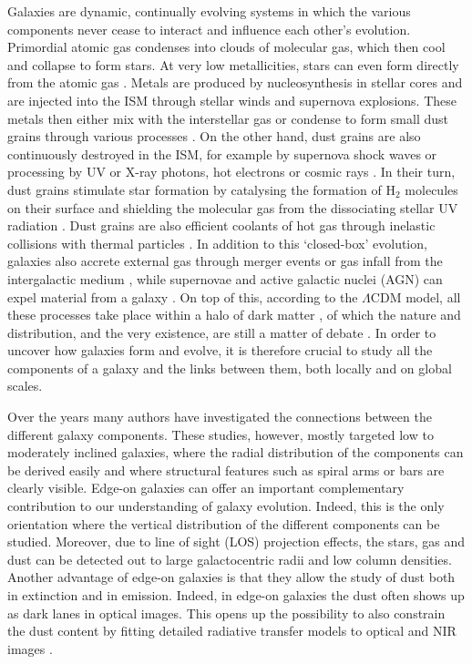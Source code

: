 \documentclass{aa}
\begin{document}
Galaxies are dynamic, continually evolving systems in which the various components never cease to interact and influence each other's evolution. Primordial atomic gas condenses into clouds of molecular gas, which then cool and collapse to form stars. At very low metallicities, stars can even form directly from the atomic gas \citep[e.g.][]{krumholz12}. Metals are produced by nucleosynthesis in stellar cores and are injected into the ISM through stellar winds and supernova explosions. These metals then either mix with the interstellar gas or condense to form small dust grains through various processes \citep[see e.g.][]{dwekscalo80,kozasa91,dwek98,zhukovska13,zhukovska14}. On the other hand, dust grains are also continuously destroyed in the ISM, for example by supernova shock waves or processing by UV or X-ray photons, hot electrons or cosmic rays \citep[e.g.][]{jones04,micelotti10,jones11,bocchio12}. In their turn, dust grains stimulate star formation by catalysing the formation of H$_{2}$ molecules on their surface and shielding the molecular gas from the dissociating stellar UV radiation \citep{gould63,hollenbach71,cazaux02}. Dust grains are also efficient coolants of hot gas through inelastic collisions with thermal particles \citep[e.g.][]{dalgarno72,ostriker73}. In addition to this `closed-box' evolution, galaxies also accrete external gas through merger events or gas infall from the intergalactic medium \citep[e.g.][]{sancisi08,ocvirk08,keres09a,diteodoro14}, while supernovae and active galactic nuclei (AGN) can expel material from a galaxy \citep[e.g.][]{keres09b,alatalo11,lagos13,sharma13}. On top of this, according to the $\Lambda$CDM model, all these processes take place within a halo of dark matter \citep[see e.g.][]{zwicky37,trimble87,sahni05}, of which the nature and distribution, and the very existence, are still a matter of debate \citep[e.g.][]{milgrom83,deblok10,feng10,famaey12}. In order to uncover how galaxies form and evolve, it is therefore crucial to study all the components of a galaxy and the links between them, both locally and on global scales.
\par
Over the years many authors have investigated the connections between the different galaxy components. These studies, however, mostly targeted low to moderately inclined galaxies, where the radial distribution of the components can be derived easily and where structural features such as spiral arms or bars are clearly visible. Edge-on galaxies can offer an important complementary contribution to our understanding of galaxy evolution. Indeed, this is the only orientation where the vertical distribution of the different components can be studied. Moreover, due to line of sight (LOS) projection effects, the stars, gas and dust can be detected out to large galactocentric radii and low column densities. Another advantage of edge-on galaxies is that they allow the study of dust both in extinction and in emission. Indeed, in edge-on galaxies the dust often shows up as dark lanes in optical images. This opens up the possibility to also constrain the dust content by fitting detailed radiative transfer models to optical and NIR images \citep{xilouris97,xilouris99,bianchi07,baes11,delooze12,degeyter13,schechtman13,degeyter14}.
\end{document}
